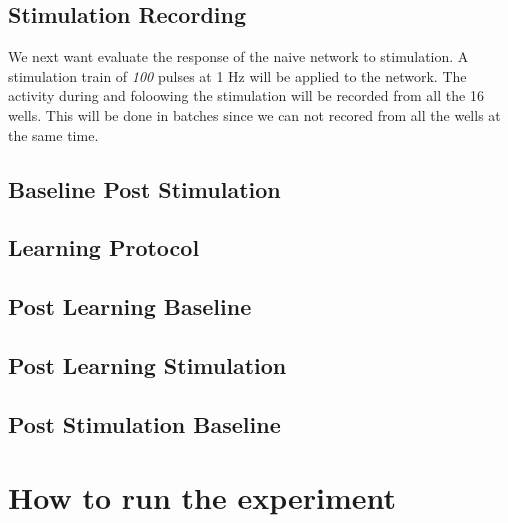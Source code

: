 \documentclass{article}
\begin{document}
\subsection{Stimulation Recording}
We next want evaluate the response of the naive network to stimulation.
A stimulation train of \textit{100} pulses at 1 Hz will be applied to the network. The activity during and foloowing the stimulation will
be recorded from all the 16 wells. This will be done in batches since we can not recored from all the wells at the same time. 
\subsection{Baseline Post Stimulation}

\subsection{Learning Protocol}

\subsection{Post Learning Baseline}

\subsection{Post Learning Stimulation}

\subsection{Post Stimulation Baseline}

\section{How to run the experiment}
\end{document}
